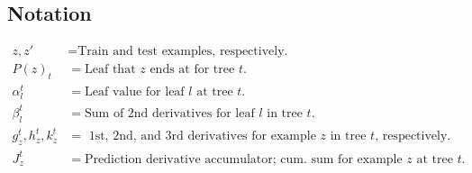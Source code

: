 \documentclass[12pt]{article}
\begin{document}
\subsection*{Notation}
\begin{align*}
z, z' &= \text{Train and test examples, respectively.} \\
P(z)_t &= \text{Leaf that $z$ ends at for tree $t$.} \\
\alpha_l^t &= \text{Leaf value for leaf $l$ at tree $t$.} \\
\beta_l^t &= \text{Sum of 2nd derivatives for leaf $l$ in tree $t$.} \\
g_z^t, h_z^t, k_z^t &= \text{ 1st, 2nd, and 3rd derivatives for example $z$ in tree $t$, respectively.} \\
J_z^t &= \text{Prediction derivative accumulator; cum. sum for example $z$ at tree $t$.} \\
\end{align*}
\end{document}
